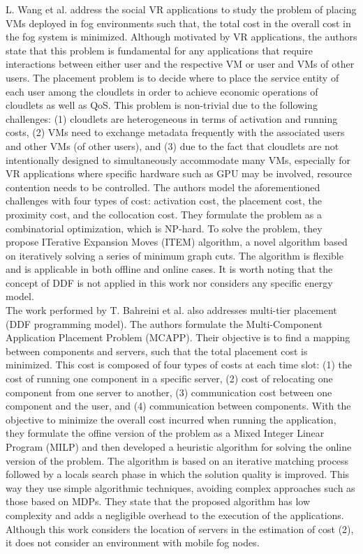 \noindent\tab L. Wang et al. \cite{wang2018service} address the social VR applications to study the problem of placing VMs deployed in fog environments such that, the total cost in the overall cost in the fog system is minimized. Although motivated by VR applications, the authors state that this problem is fundamental for any applications that require interactions between either user and the respective VM or user and VMs of other users. The placement problem is to decide where to place the service entity of each user among the cloudlets in order to achieve economic operations of cloudlets as well as QoS. This problem is non-trivial due to the following challenges: (1) cloudlets are heterogeneous in terms of activation and running costs, (2) VMs need to exchange metadata frequently with the associated users and other VMs (of other users), and (3) due to the fact that cloudlets are not intentionally designed to simultaneously accommodate many VMs, especially for VR applications where specific hardware such as GPU may be involved, resource contention needs to be controlled. The authors model the aforementioned challenges with four types of cost: activation cost, the placement cost, the proximity cost, and the collocation cost. They formulate the problem as a combinatorial optimization, which is NP-hard. To solve the problem, they propose ITerative Expansion Moves (ITEM) algorithm, a novel algorithm based on iteratively solving a series of minimum graph cuts. The algorithm is flexible and is applicable in both offline and online cases. It is worth noting that the concept of DDF is not applied in this work nor considers any specific energy model.\\
\noindent\tab The work performed by T. Bahreini et al. \cite{bahreini2017efficient} also addresses multi-tier placement (DDF programming model). The authors formulate the Multi-Component Application Placement Problem (MCAPP). Their objective is to find a mapping between components and servers, such that the total placement cost is minimized. This cost is composed of four types of costs at each time slot: (1) the cost of running one component in a specific server, (2) cost of relocating one component from one server to another, (3) communication cost between one component and the user, and (4) communication between components. With the objective to minimize the overall cost incurred when running the application, they formulate the offine version of the problem as a Mixed Integer Linear Program (MILP) and then developed a heuristic algorithm for solving the online version of the problem. The algorithm is based on an iterative matching process followed by a locals search phase in which the solution quality is improved. This way they use simple algorithmic techniques, avoiding complex approaches such as those based on MDPs. They state that the proposed algorithm has low complexity and adds a negligible overhead to the execution of the applications. Although this work considers the location of servers in the estimation of cost (2), it does not consider an environment with mobile fog nodes.\\
